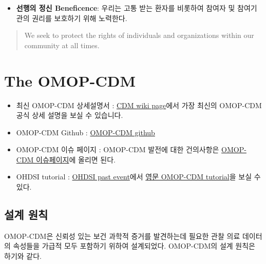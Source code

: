 \documentclass[]{book}
\providecommand{\tightlist}{%
  \setlength{\itemsep}{0pt}\setlength{\parskip}{0pt}}
\begin{document}
\begin{itemize}
\tightlist
\item
  \textbf{선행의 정신 Beneficence}: 우리는 고통 받는 환자를 비롯하여 참여자 및 참여기관의 권리를 보호하기 위해 노력한다.
\end{itemize}

\begin{quote}
We seek to protect the rights of individuals and organizations within our community at all times.
\end{quote}

\hypertarget{omopCdm}{%
\chapter{The OMOP-CDM}\label{omopCdm}}

\begin{itemize}
\tightlist
\item
  최신 OMOP-CDM 상세설명서 : \href{https://github.com/ohdsi/commondatamodel/wiki}{CDM wiki page}에서 가장 최신의 OMOP-CDM 공식 상세 설명을 보실 수 있습니다.
\item
  OMOP-CDM Github : \href{https://github.com/ohdsi/commondatamodel}{OMOP-CDM github}
\item
  OMOP-CDM 이슈 페이지 : OMOP-CDM 발전에 대한 건의사항은 \href{https://github.com/ohdsi/commondatamodel/issues}{OMOP-CDM 이슈페이지}에 올리면 된다.
\item
  OHDSI tutorial : \href{https://www.ohdsi.org/past-events/}{OHDSI past event}에서 \href{https://www.ohdsi.org/past-events/2018-tutorials-omop-common-data-model-and-standardized-vocabularies/}{영문 OMOP-CDM tutorial}을 보실 수 있다.
\end{itemize}

\hypertarget{section-3}{%
\section{설계 원칙}\label{section-3}}

OMOP-CDM은 신뢰성 있는 보건 과학적 증거를 발견하는데 필요한 관찰 의료 데이터의 속성들을 가급적 모두 포함하기 위하여 설계되었다. OMOP-CDM의 설계 원칙은 하기와 같다.
\end{document}
